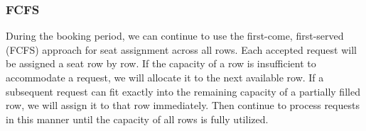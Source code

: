 
\subsubsection{FCFS}\label{largest_pattern}
During the booking period, we can continue to use the first-come, first-served (FCFS) approach for seat assignment across all rows. Each accepted request will be assigned a seat row by row. If the capacity of a row is insufficient to accommodate a request, we will allocate it to the next available row. If a subsequent request can fit exactly into the remaining capacity of a partially filled row, we will assign it to that row immediately. Then continue to process requests in this manner until the capacity of all rows is fully utilized.





